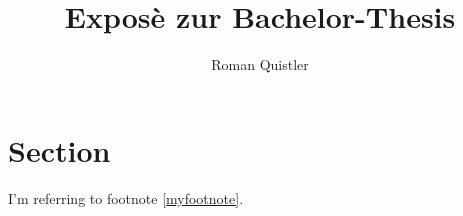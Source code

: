 \documentclass[11pt]{scrartcl}
\title{Exposè zur Bachelor-Thesis}
\author{Roman Quistler}
\begin{document}
	
	
	
	\newpage
	\tableofcontents
	\newpage
	
	\section{Section}
	\label{sec:einleitende-worte}
	
	I'm referring to footnote \ref{myfootnote}.
	
	\newpage
		
	\begin{appendix}
		\listoffigures
	\end{appendix}
	
	\printbibliography
		
\end{document}
